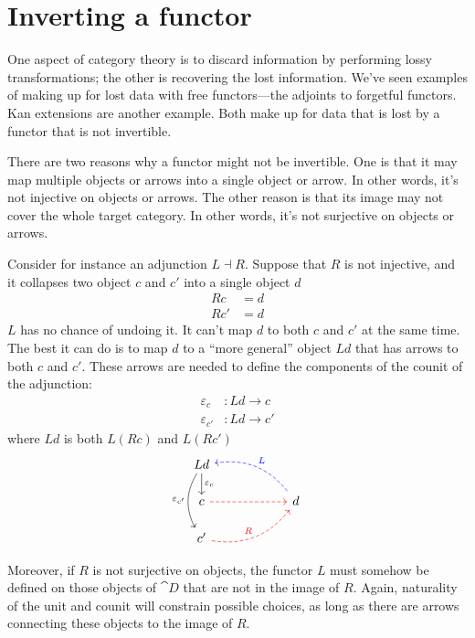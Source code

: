 \documentclass[DaoFP]{subfiles}
\begin{document}
\section{Inverting a functor}

One aspect of category theory is to discard information by performing lossy transformations; the other is recovering the lost information. We've seen examples of making up for lost data with free functors---the adjoints to forgetful functors. Kan extensions are another example. Both make up for data that is lost by a functor that is not invertible.

There are two reasons why a functor might not be invertible. One is that it may map multiple objects or arrows into a single object or arrow. In other words, it's not injective on objects or arrows. The other reason is that its image may not cover the whole target category. In other words, it's not surjective on objects or arrows.

Consider for instance an adjunction $L \dashv R$. Suppose that $R$ is not injective, and it collapses two object $c$ and $c'$ into a single object $d$
\begin{align*}
R c &= d \\
R c' &= d
\end{align*}
$L$ has no chance of undoing it. It can't map $d$ to both $c$ and $c'$ at the same time. The best it can do is to map $d$ to a ``more general'' object $L d$ that has arrows to both $c$ and $c'$. These arrows are needed to define the components of the counit of the adjunction:
\begin{align*}
\varepsilon_c &\colon L d \to c
\\
\varepsilon_{c'} &\colon L d \to c'
\end{align*}
where $L d$ is both $L (R c)$ and $L (R c')$
\[
 \begin{tikzcd} [row sep=0.5cm, column sep=1cm]
 L d
 \arrow[d, "\varepsilon_c"]
 \arrow[dd, bend right, "\varepsilon_{c'}"']
 \\
 c
 \arrow[rr, red, dashed, ""]
 && d
 \arrow[ull, blue, bend right, dashed, "L"']
 \\
 c'
 \arrow[urr, red, bend right, dashed, "R"]
  \end{tikzcd}
\]


Moreover, if $R$ is not surjective on objects, the functor $L$ must somehow be defined on those objects of $\cat D$ that are not in the image of $R$. Again, naturality of the unit and counit will constrain possible choices, as long as there are arrows connecting these objects to the image of $R$. 
\end{document}
